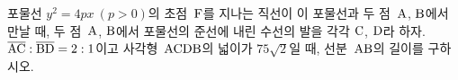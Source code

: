 포물선 $y^2=4px\ (p>0)$의 초점~$\mathrm{F}$를 지나는 직선이 이 포물선과 두 점~$\mathrm{A}$, $\mathrm{B}$에서 만날 때, 두 점~$\mathrm{A}$, $\mathrm{B}$에서 포물선의 준선에 내린 수선의 발을 각각 $\mathrm{C}$, $\mathrm{D}$라 하자. $\overline{\mathrm{AC}}:\overline{\mathrm{BD}}=2:1$이고 사각형~$\mathrm{ACDB}$의 넓이가 $75\sqrt{2}$일 때, 선분~$\mathrm{AB}$의 길이를 구하시오. 
